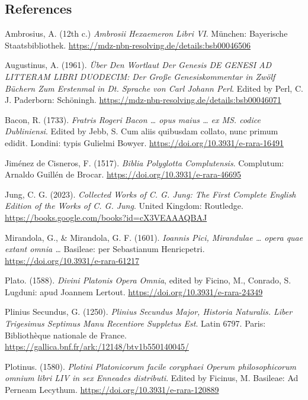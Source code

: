 \documentclass[
]{article}
\begin{document}
\hypertarget{references}{%
\subsection{References}\label{references}}

Ambrosius, A. (12th c.) \emph{Ambrosii Hexaemeron Libri VI}. München:
Bayerische Staatsbibliothek.
\url{https://mdz-nbn-resolving.de/details:bsb00046506}

Augustinus, A. (1961). \emph{Über Den Wortlaut Der Genesis DE GENESI AD
LITTERAM LIBRI DUODECIM: Der Große Genesiskommentar in Zwölf Büchern Zum
Erstenmal in Dt. Sprache von Carl Johann Perl}. Edited by Perl, C. J.
Paderborn: Schöningh.
\url{https://mdz-nbn-resolving.de/details:bsb00046071}

Bacon, R. (1733). \emph{Fratris Rogeri Bacon \ldots{} opus maius
\ldots{} ex MS. codice Dubliniensi}. Edited by Jebb, S. Cum aliis
quibusdam collato, nunc primum edidit. Londini: typis Gulielmi Bowyer.
\url{https://doi.org/10.3931/e-rara-16491}

Jiménez de Cisneros, F. (1517). \emph{Biblia Polyglotta Complutensis}.
Complutum: Arnaldo Guillén de Brocar.
\url{https://doi.org/10.3931/e-rara-46695}

Jung, C. G. (2023). \emph{Collected Works of C. G. Jung: The First
Complete English Edition of the Works of C. G. Jung}. United Kingdom:
Routledge. \url{https://books.google.com/books?id=cX3VEAAAQBAJ}

Mirandola, G., \& Mirandola, G. F. (1601). \emph{Ioannis Pici,
Mirandulae \ldots{} opera quae extant omnia \ldots{}} Basileae: per
Sebastianum Henricpetri. \url{https://doi.org/10.3931/e-rara-61217}

Plato. (1588). \emph{Divini Platonis Opera Omnia}, edited by Ficino, M.,
Conrado, S. Lugduni: apud Joannem Lertout.
\url{https://doi.org/10.3931/e-rara-24349}

Plinius Secundus, G. (1250). \emph{Plinius Secundus Major, Historia
Naturalis. Liber Trigesimus Septimus Manu Recentiore Suppletus Est}.
Latin 6797. Paris: Bibliothèque nationale de France.
\url{https://gallica.bnf.fr/ark:/12148/btv1b550140045/}

Plotinus. (1580). \emph{Plotini Platonicorum facile coryphaei Operum
philosophicorum omnium libri LIV in sex Enneades distributi}. Edited by
Ficinus, M. Basileae: Ad Perneam Lecythum.
\url{https://doi.org/10.3931/e-rara-120889}
\end{document}
